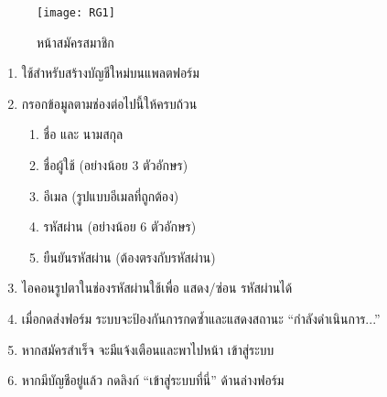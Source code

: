 \newpage

\vspace{\baselineskip}

\begin{figure}[h]
	\centering
	\texttt{[image: RG1]}
	\caption{หน้าสมัครสมาชิก}
\end{figure}

\par

\begin{sloppypar}
	\begin{enumerate}
		\item ใช้สำหรับสร้างบัญชีใหม่บนแพลตฟอร์ม
		\item กรอกข้อมูลตามช่องต่อไปนี้ให้ครบถ้วน
		\begin{enumerate}
			\item ชื่อ และ นามสกุล
			\item ชื่อผู้ใช้ (อย่างน้อย 3 ตัวอักษร)
			\item อีเมล (รูปแบบอีเมลที่ถูกต้อง)
			\item รหัสผ่าน (อย่างน้อย 6 ตัวอักษร)
			\item ยืนยันรหัสผ่าน (ต้องตรงกับรหัสผ่าน)
		\end{enumerate}
		\item ไอคอนรูปตาในช่องรหัสผ่านใช้เพื่อ แสดง/ซ่อน รหัสผ่านได้
		\item เมื่อกดส่งฟอร์ม ระบบจะป้องกันการกดซ้ำและแสดงสถานะ “กำลังดำเนินการ...”
		\item หากสมัครสำเร็จ จะมีแจ้งเตือนและพาไปหน้า เข้าสู่ระบบ 
		\item หากมีบัญชีอยู่แล้ว กดลิงก์ “เข้าสู่ระบบที่นี่” ด้านล่างฟอร์ม
	\end{enumerate}
\end{sloppypar}

\par



